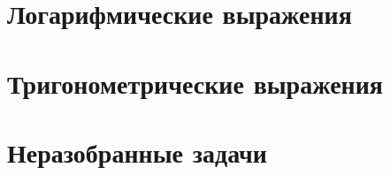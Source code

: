 \documentclass[10pt, a4paper]{article}
\begin{document}
\section{Логарифмические выражения}
\section{Тригонометрические выражения}
\section{Неразобранные задачи}	
\end{document}
